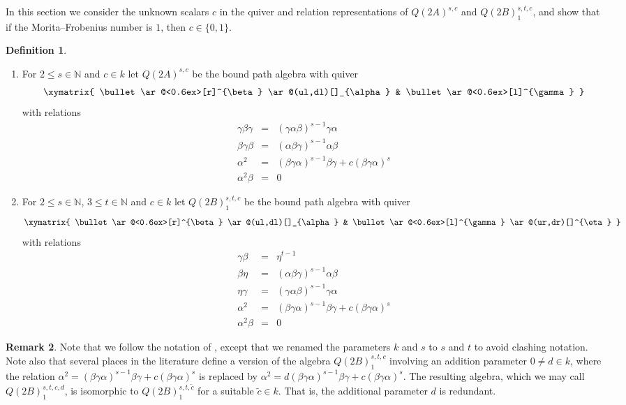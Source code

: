 \documentclass{amsart}
\theoremstyle{plain}\newtheorem{Theorem}{Theorem}[section]
\theoremstyle{plain}\newtheorem{Conjecture}[Theorem]{Conjecture}
\theoremstyle{plain}\newtheorem{Corollary}[Theorem]{Corollary}
\theoremstyle{plain}\newtheorem{Lemma}[Theorem]{Lemma}
\theoremstyle{plain}\newtheorem{Proposition}[Theorem]{Proposition}
\theoremstyle{definition}\newtheorem{Definition}[Theorem]{Definition}
\theoremstyle{definition}\newtheorem{Example}[Theorem]{Example}
\theoremstyle{definition}\newtheorem{Examples}[Theorem]{Examples}
\theoremstyle{definition}\newtheorem{Exercise}[Theorem]{Exercise}
\theoremstyle{definition}\newtheorem{Notation}[Theorem]{Notation}
\theoremstyle{definition}\newtheorem{Remark}[Theorem]{Remark}
\theoremstyle{definition}\newtheorem{Remarks}[Theorem]{Remarks}
\numberwithin{equation}{section}
\begin{document}
In this section we consider the unknown scalars $c$ in the quiver and relation representations of $Q(2A)^{s,c}$ and $Q(2B)_1^{s,t,c}$, and show that if the Morita--Frobenius number is $1$, then $c \in \{ 0,1\}$.

\begin{Definition}
  \begin{enumerate}
  \item For $2\leq s \in \mathbb N$ and $c\in k$ let $Q(2A)^{s,c}$  be the bound path algebra with quiver 
  $$
    \xymatrix{
    \bullet \ar@<0.6ex>[r]^{\beta} \ar@(ul,dl)[]_{\alpha}
    &
    \bullet \ar@<0.6ex>[l]^{\gamma}
    }
  $$
  with relations
  $$
    \begin{array}{rcl}
    \gamma\beta\gamma &=& (\gamma\alpha\beta)^{s-1}\gamma\alpha \\
    \beta\gamma\beta &=& (\alpha\beta\gamma)^{s-1}\alpha\beta \\
    \alpha^2 &=& (\beta\gamma\alpha)^{s-1}\beta\gamma + c(\beta\gamma\alpha)^s \\
    \alpha^2\beta &=& 0
    \end{array}
  $$
  \item For $2\leq s \in \mathbb N$, $3\leq t \in \mathbb N$ and $c\in k$ let $Q(2B)_1^{s,t,c}$  be the bound path algebra with quiver 
  $$
    \xymatrix{
    \bullet \ar@<0.6ex>[r]^{\beta} \ar@(ul,dl)[]_{\alpha}
    &
    \bullet \ar@<0.6ex>[l]^{\gamma} \ar@(ur,dr)[]^{\eta}
    }
  $$
  with relations
  $$
    \begin{array}{rcl}
    \gamma\beta&=&\eta^{t-1} \\
    \beta\eta&=&(\alpha\beta\gamma)^{s-1}\alpha\beta \\
    \eta\gamma&=&(\gamma\alpha\beta)^{s-1}\gamma\alpha\\
    \alpha^2 &=& (\beta\gamma\alpha)^{s-1}\beta\gamma + c(\beta\gamma\alpha)^s \\
    \alpha^2\beta &=& 0
    \end{array}
  $$
  \end{enumerate}
\end{Definition}

\begin{Remark}
  Note that we follow the notation of \cite{Erdmann88}, except that we renamed the parameters $k$ and $s$ to $s$ and $t$ to avoid clashing notation. Note also that several places in the literature define a version of the algebra $Q(2B)_1^{s,t,c}$ involving an addition parameter $0\neq d\in k$, where the relation $\alpha^2 = (\beta\gamma\alpha)^{s-1}\beta\gamma + c(\beta\gamma\alpha)^s$ is replaced by $\alpha^2 = d(\beta\gamma\alpha)^{s-1}\beta\gamma + c(\beta\gamma\alpha)^s$. The resulting algebra, which we may call $Q(2B)_1^{s,t,c,d}$, is isomorphic to $Q(2B)_1^{s,t,\tilde c}$ for a suitable $\tilde c\in k$. That is, the additional parameter $d$ is redundant.
\end{Remark}
\end{document}
